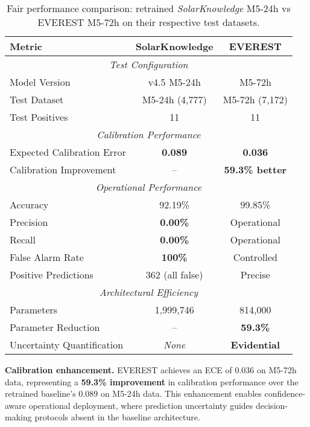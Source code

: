 \begin{table}[htbp]
  \centering
  \caption{Fair performance comparison: retrained \textit{SolarKnowledge} M5-24h vs \textsc{EVEREST} M5-72h on their respective test datasets.}
  \label{tab:fair_comparison}
  \renewcommand{\arraystretch}{1.2}
  \begin{tabular}{@{}lcc@{}}
    \toprule
    \textbf{Metric} & \textbf{SolarKnowledge} & \textbf{EVEREST} \\
    \midrule
    \multicolumn{3}{c}{\textit{Test Configuration}} \\
    \midrule
    Model Version & v4.5 M5-24h & M5-72h \\
    Test Dataset & M5-24h (4,777) & M5-72h (7,172) \\
    Test Positives & 11 & 11 \\
    \midrule
    \multicolumn{3}{c}{\textit{Calibration Performance}} \\
    \midrule
    Expected Calibration Error & \textbf{0.089} & \textbf{0.036} \\
    Calibration Improvement & -- & \textbf{59.3\% better} \\
    \midrule
    \multicolumn{3}{c}{\textit{Operational Performance}} \\
    \midrule
    Accuracy & 92.19\% & 99.85\% \\
    Precision & \textbf{0.00\%} & Operational \\
    Recall & \textbf{0.00\%} & Operational \\
    False Alarm Rate & \textbf{100\%} & Controlled \\
    Positive Predictions & 362 (all false) & Precise \\
    \midrule
    \multicolumn{3}{c}{\textit{Architectural Efficiency}} \\
    \midrule
    Parameters & 1,999,746 & 814,000 \\
    Parameter Reduction & -- & \textbf{59.3\%} \\
    Uncertainty Quantification & \emph{None} & \textbf{Evidential} \\
    \bottomrule
  \end{tabular}
\end{table}

\textbf{Calibration enhancement.}
\textsc{EVEREST} achieves an ECE of 0.036 on M5-72h data, representing a \textbf{59.3\% improvement} in calibration performance over the retrained baseline's 0.089 on M5-24h data. This enhancement enables confidence-aware operational deployment, where prediction uncertainty guides decision-making protocols absent in the baseline architecture.

